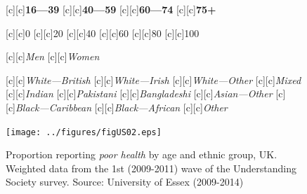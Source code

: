 \documentclass[11 pt, a4paper]{report}
\begin{document}


\begin{figure}[hbtp!]
[c][c]{\small{\textbf{16---39}}}
[c][c]{\small{\textbf{40---59}}}
[c][c]{\small{\textbf{60---74}}}
[c][c]{\small{\textbf{75+}}}

[c][c]{\small{0}}
[c][c]{\small{20}}
[c][c]{\small{40}}
[c][c]{\small{60}}
[c][c]{\small{80}}
[c][c]{\small{100}}

[c][c]{\small{\emph{Men}}}
[c][c]{\small{\emph{Women}}}

[c][c]{\scriptsize{\emph{White---British}}}
[c][c]{\scriptsize{\emph{White---Irish}}}
[c][c]{\scriptsize{\emph{White---Other}}}
[c][c]{\scriptsize{\emph{Mixed}}}
[c][c]{\scriptsize{\emph{Indian}}}
[c][c]{\scriptsize{\emph{Pakistani}}}
[c][c]{\scriptsize{\emph{Bangladeshi}}}
[c][c]{\scriptsize{\emph{Asian---Other}}}
[c][c]{\scriptsize{\emph{Black---Caribbean}}}
[c][c]{\scriptsize{\emph{Black---African}}}
[c][c]{\scriptsize{\emph{Other}}}



\texttt{[image: ../figures/figUS02.eps]}
\caption{Proportion reporting \emph{poor health} by age and ethnic group, UK. Weighted data from the 1st (2009-2011) wave of the Understanding Society  survey. Source: University of Essex (2009-2014) }\label{Fig:US02}  %
\end{figure}
\end{document}
